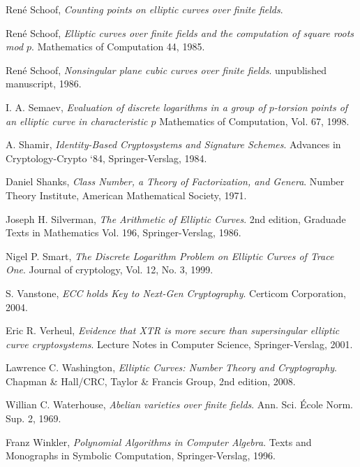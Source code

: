 \documentclass{article}
\numberwithin{equation}{section}
\theoremstyle{definition}
\begin{document}
\begin{thebibliography}{9}
  Ren\'e Schoof,
  \emph{Counting points on elliptic curves over finite fields}.

  Ren\'e Schoof,
  \emph{Elliptic curves over finite fields and the computation of square roots mod $p$}.
  Mathematics of Computation 44,
  1985.

  Ren\'e Schoof,
  \emph{Nonsingular plane cubic curves over finite fields}.
  unpublished manuscript,
  1986.

  I. A. Semaev,
  \emph{Evaluation of discrete logarithms in a group of $p$-torsion points of an elliptic curve in characteristic $p$}
  Mathematics of Computation,
  Vol. 67,
  1998.

  A. Shamir,
  \emph{Identity-Based Cryptosystems and Signature Schemes}.
  Advances in Cryptology-Crypto `84,
  Springer-Verslag,
  1984.

  Daniel Shanks,
  \emph{Class Number, a Theory of Factorization, and Genera}.
  Number Theory Institute,
  American Mathematical Society,
  1971.

  Joseph H. Silverman,
  \emph{The Arithmetic of Elliptic Curves}.
  2nd edition,
  Graduade Texts in Mathematics Vol. 196,
  Springer-Verslag,
  1986.

  Nigel P. Smart,
  \emph{The Discrete Logarithm Problem on Elliptic Curves of Trace One}.
  Journal of cryptology,
  Vol. 12,
  No. 3,
  1999.

  S. Vanstone,
  \emph{ECC holds Key to Next-Gen Cryptography}.
  Certicom Corporation, 
  2004.

  Eric R. Verheul,
  \emph{Evidence that XTR is more secure than supersingular elliptic curve cryptosystems}.
  Lecture Notes in Computer Science,
  Springer-Verslag,
  2001.

  Lawrence C. Washington,
  \emph{Elliptic Curves: Number Theory and Cryptography}. 
  Chapman & Hall/CRC, Taylor & Francis Group,
  2nd edition,
  2008.

  Willian C. Waterhouse,
  \emph{Abelian varieties over finite fields}.
  Ann. Sci. \'Ecole Norm. Sup. 2,
  1969.

  Franz Winkler,
  \emph{Polynomial Algorithms in Computer Algebra}.
  Texts and Monographs in Symbolic Computation,
  Springer-Verslag,
  1996.

\end{thebibliography}\newpage
\end{document}
